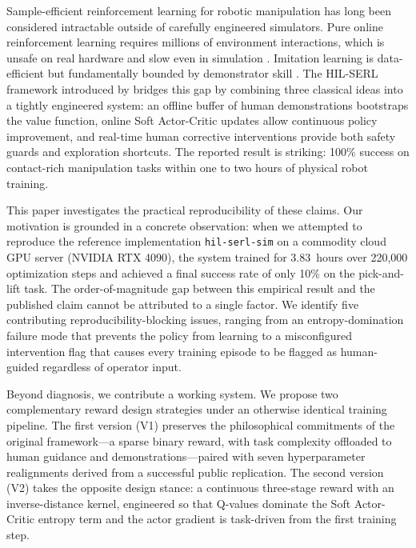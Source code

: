 \documentclass[12pt,a4paper]{article}
\begin{document}
Sample-efficient reinforcement learning for robotic manipulation has long been considered intractable outside of carefully engineered simulators. Pure online reinforcement learning requires millions of environment interactions, which is unsafe on real hardware and slow even in simulation \citep{andrychowicz2020learning}. Imitation learning is data-efficient but fundamentally bounded by demonstrator skill \citep{ross2011reduction}. The HIL-SERL framework introduced by \citet{luo2024serl} bridges this gap by combining three classical ideas into a tightly engineered system: an offline buffer of human demonstrations bootstraps the value function, online Soft Actor-Critic \citep{haarnoja2018soft} updates allow continuous policy improvement, and real-time human corrective interventions provide both safety guards and exploration shortcuts. The reported result is striking: 100\% success on contact-rich manipulation tasks within one to two hours of physical robot training.

This paper investigates the practical reproducibility of these claims. Our motivation is grounded in a concrete observation: when we attempted to reproduce the reference implementation \texttt{hil-serl-sim} on a commodity cloud GPU server (NVIDIA RTX 4090), the system trained for 3.83~hours over 220{,}000 optimization steps and achieved a final success rate of only 10\% on the pick-and-lift task. The order-of-magnitude gap between this empirical result and the published claim cannot be attributed to a single factor. We identify five contributing reproducibility-blocking issues, ranging from an entropy-domination failure mode that prevents the policy from learning to a misconfigured intervention flag that causes every training episode to be flagged as human-guided regardless of operator input.

Beyond diagnosis, we contribute a working system. We propose two complementary reward design strategies under an otherwise identical training pipeline. The first version (V1) preserves the philosophical commitments of the original framework---a sparse binary reward, with task complexity offloaded to human guidance and demonstrations---paired with seven hyperparameter realignments derived from a successful public replication. The second version (V2) takes the opposite design stance: a continuous three-stage reward with an inverse-distance kernel, engineered so that Q-values dominate the Soft Actor-Critic entropy term and the actor gradient is task-driven from the first training step.
\end{document}
